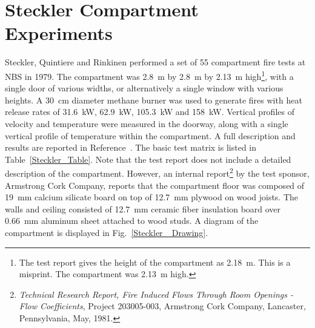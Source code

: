 \section{Steckler Compartment Experiments}
\label{Steckler_Description}

Steckler, Quintiere and Rinkinen performed a set of 55 compartment fire tests at NBS in 1979. The compartment was 2.8~m by 2.8~m by 2.13~m high\footnote{The test report gives the height of the compartment as 2.18~m. This is a misprint. The compartment was 2.13~m high.}, with a single door of various widths, or alternatively a single window with various heights. A 30~cm diameter methane burner was used to generate fires with heat release rates of 31.6~kW, 62.9~kW, 105.3~kW and 158~kW. Vertical profiles of velocity and temperature were measured in the doorway, along with a single vertical profile of temperature within the compartment. A full description and results are reported in Reference~\cite{Steckler:NBSIR_82-2520}. The basic test matrix is listed in Table~\ref{Steckler_Table}. Note that the test report does not include a detailed description of the compartment. However, an internal report\footnote{ {\em Technical Research Report, Fire Induced Flows Through Room Openings - Flow Coefficients}, Project 203005-003, Armstrong Cork Company, Lancaster, Pennsylvania, May, 1981.} by the test sponsor, Armstrong Cork Company, reports that the compartment floor was composed of 19~mm calcium silicate board on top of 12.7~mm plywood on wood joists. The walls and ceiling consisted of 12.7~mm ceramic fiber insulation board over 0.66~mm aluminum sheet attached to wood studs. A diagram of the compartment is displayed in Fig.~\ref{Steckler_ Drawing}.

